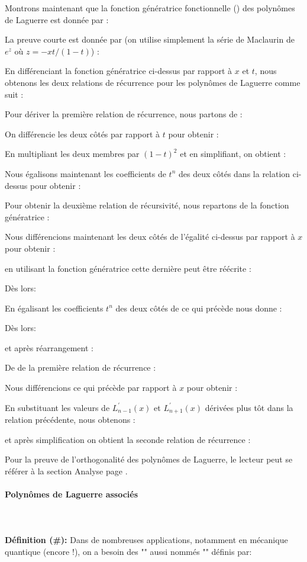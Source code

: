 	Montrons maintenant que la fonction génératrice fonctionnelle () des polynômes de Laguerre est donnée par :
	
	La preuve courte est donnée par (on utilise simplement la série de Maclaurin de $e^{z}$ où $z=-xt/(1-t)$) :
	
	En différenciant la fonction génératrice ci-dessus par rapport à $x$ et $t$, nous obtenons les deux relations de récurrence pour les polynômes de Laguerre comme suit :
	
	Pour dériver la première relation de récurrence, nous partons de :
	
	On différencie les deux côtés par rapport à $t$ pour obtenir :
	
	En multipliant les deux membres par $(1-t)^{2}$ et en simplifiant, on obtient :
	
	Nous égalisons maintenant les coefficients de $t^{n}$ des deux côtés dans la relation ci-dessus pour obtenir :
	
	Pour obtenir la deuxième relation de récursivité, nous repartons de la fonction génératrice :
	
	Nous différencions maintenant les deux côtés de l'égalité ci-dessus par rapport à $x$ pour obtenir :
	
	en utilisant la fonction génératrice cette dernière peut être réécrite :
	
	Dès lors:
	
	En égalisant les coefficients $t^{n}$ des deux côtés de ce qui précède nous donne :
	
	Dès lors:
	
	et après réarrangement :
	
	De de la première relation de récurrence :
	
	Nous différencions ce qui précède par rapport à $x$ pour obtenir :
	
	En substituant les valeurs de $L_{n-1}^{\prime}(x)$ et $L_{n+1}^{\prime}(x)$ dérivées plus tôt dans la relation précédente, nous obtenons :
	
	et après simplification on obtient la seconde relation de récurrence :
	
	Pour la preuve de l'orthogonalité des polynômes de Laguerre, le lecteur peut se référer à la section Analyse page \pageref{orthogonality of Laguerre polynomial}.
		
	\paragraph{Polynômes de Laguerre associés}\label{Associated Laguerre polynomials}\mbox{}\\\\
	\textbf{Définition (\#\mydef):} Dans de nombreuses applications, notamment en mécanique quantique (encore !), on a besoin des "" aussi nommés "" définis par:
	
